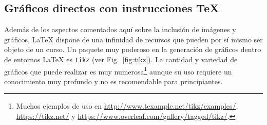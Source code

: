 \documentclass[11pt,a4paper]{article}
\begin{document}
\subsection{Gráficos directos con instrucciones \TeX}
Además de los aspectos comentados aquí sobre la inclusión de imágenes y gráficos, \LaTeX{} dispone de una infinidad de recursos que pueden por sí mismo ser objeto de un curso. Un paquete muy poderoso en la generación de gráficos dentro de entornos \LaTeX{} es \texttt{tikz} (ver Fig.~\ref{fig:tikz}). La cantidad y variedad de gráficos que puede realizar es muy numerosa\footnote{Muchos ejemplos de uso en \url{http://www.texample.net/tikz/examples/}, \url{https://tikz.net/} y \url{https://www.overleaf.com/gallery/tagged/tikz/}.} aunque su uso requiere un conocimiento muy profundo y no es recomendable para principiantes.
\end{document}
